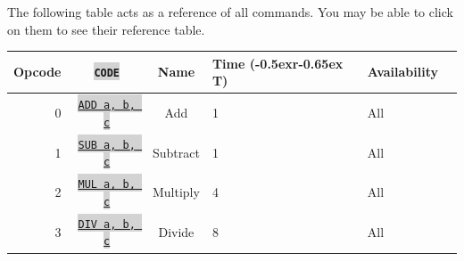 \documentclass{article}
\newcommand{\vnscode}[1]{\colorbox{lightgray}{\lstinline[language=vns]{#1}}}
\newcommand{\RT}{\lower-0.5ex\hbox{r}\kern-0.65ex T}
\begin{document}
The following table acts as a reference of all commands. You may be able to
click on them to see their reference table.

\centering
\begin{tabular}{|r|c|c|l|l|l|}
    \hline Opcode & \vnscode{CODE} & Name & Time (\RT) & Availability \\ \hline
    0 & \hyperref[table:arithmetic]{\vnscode{ADD a, b, c}} & Add & 1 & All \\ \hline
    1 & \hyperref[table:arithmetic]{\vnscode{SUB a, b, c}} & Subtract & 1 & All \\ \hline
    2 & \hyperref[table:arithmetic]{\vnscode{MUL a, b, c}} & Multiply & 4 & All \\ \hline
    3 & \hyperref[table:arithmetic]{\vnscode{DIV a, b, c}} & Divide & 8 & All \\ \hline
\end{tabular}
\end{document}
